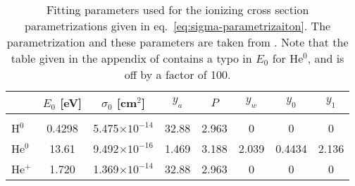 
\begin{table}
\centering
\begin{tabular}{l | c c c c c c c }
    & $E_0$ [eV]  & $\sigma_0$ [cm$^2$] & $y_a$ & $P$ & $y_w$ & $y_0$ & $y_1$ \\
\hline\\[-0.5em]
H$^0$  & 0.4298 & 5.475$\times 10^{-14}$ & 32.88 & 2.963 & 0     & 0 & 0 \\
He$^0$ & 13.61  & 9.492$\times 10^{-16}$ & 1.469 & 3.188 & 2.039 & 0.4434 & 2.136 \\
He$^+$ & 1.720  & 1.369$\times 10^{-14}$ & 32.88 & 2.963 & 0     & 0 & 0 \\
 \end{tabular}
\caption{Fitting parameters used for the ionizing cross section parametrizations given in
eq.~\ref{eq:sigma-parametrizaiton}. The parametrization and these parameters are taken from
\cite{vernerAtomicDataAstrophysics1996}. Note that the table given in the appendix of
\cite{ramses-rt13} contains a typo in $E_0$ for He$^0$, and is off by a factor of 100.}
\label{tab:cross-sections}
\end{table}
